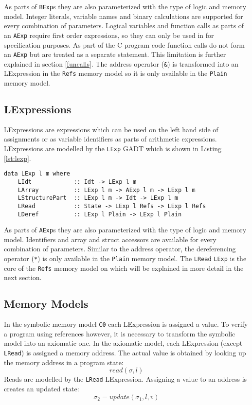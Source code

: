 \documentclass[12pt]{article}
\begin{document}
As parts of \texttt{BExp}s they are also parameterized with the type of logic and memory model.
Integer literals, variable names and binary calculations are supported for every combination of parameters.
Logical variables and function calls as parts of an \texttt{AExp} require first order expressions, so they can only be used in for specification purposes. 
As part of the C program code function calls do not form an \texttt{AExp} but are treated as a separate statement.
This limitation is further explained in section \ref{funcalls}.
The address operator (\texttt{\&}) is transformed into an LExpression in the \texttt{Refs} memory model so it is only available in the \texttt{Plain} memory model.

\subsection{LExpressions}
LExpressions are expressions which can be used on the left hand side of assignments or as variable identifiers as parts of arithmetic expressions. LExpressions are modelled by the \texttt{LExp} GADT which is shown in Listing \ref{lst:lexp}.

\begin{lstlisting}[style=c0, caption=LExp, label=lst:lexp]
data LExp l m where
    LIdt            :: Idt -> LExp l m
    LArray          :: LExp l m -> AExp l m -> LExp l m
    LStructurePart  :: LExp l m -> Idt -> LExp l m
    LRead           :: State -> LExp l Refs -> LExp l Refs
    LDeref          :: LExp l Plain -> LExp l Plain
\end{lstlisting}

As parts of \texttt{AExp}s they are also parameterized with the type of logic and memory model.
Identifiers and array and struct accessors are available for every combination of parameters.
Similar to the address operator, the dereferencing operator (\texttt{*}) is only available in the \texttt{Plain} memory model.
The \texttt{LRead} \texttt{LExp} is the core of the \texttt{Refs} memory model on which will be explained in more detail in the next section.


\subsection{Memory Models}
\label{memory_models}
In the symbolic memory model \texttt{C0} each LExpression is assigned a value.
To verify a program using references however, it is necessary to transform the symbolic model into an axiomatic one.
In the axiomatic model, each LExpression (except \texttt{LRead}) is assigned a memory address.
The actual value is obtained by looking up the memory address in a program state:
\[ read(\sigma, l) \]
Reads are modelled by the \texttt{LRead} LExpression.
Assigning a value to an address is creates an updated state:
\[ \sigma_2 = update(\sigma_1, l, v) \]
\end{document}
